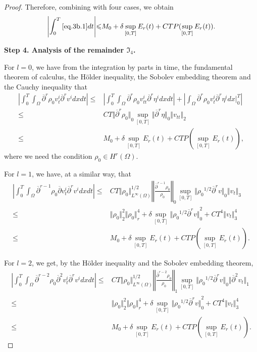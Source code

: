 \documentclass[12pt,twoside,reqno]{amsart}
\numberwithin{equation}{section}
\theoremstyle{definition}
\theoremstyle{remark}
\begin{document}
\begin{proof}
Therefore, combining with four cases, we obtain
\begin{align}
 {\left\vert{\int_0^T\eqref{eq.3b.1}dt}\right\vert} {\leqslant}  M_0+\delta \sup_{[0,T]}E_r(t)+CTP(\sup_{[0,T]}E_r(t)).
\end{align}

\textbf{Step 4. Analysis of the remainder ${\mathfrak{I}}_4$.}

For $l=0$, we have from the integration by parts in time, the fundamental theorem of calculus, the H\"older inequality, the Sobolev embedding theorem and the Cauchy inequality that
\begin{align*}
  {\left\vert{{\int_0^T\!\!\!\!\int_\Omega }  {\overline{\partial}}^r{\rho_0}  v_t^i{\overline{\partial}}^r v^idxdt}\right\vert}{\leqslant}&{\left\vert{{\int_0^T\!\!\!\!\int_\Omega }  {\overline{\partial}}^r{\rho_0}  v_{tt}^i{\overline{\partial}}^r \eta^idxdt}\right\vert}+{\left\vert{\int_\Omega {\overline{\partial}}^r{\rho_0}  v_t^i{\overline{\partial}}^r \eta^idx\Big|_0^T}\right\vert}\\
  {\leqslant}& CT {\Vert{{\overline{\partial}}^r{\rho_0}}\Vert}_0 \sup_{[0,T]}{\Vert{{\overline{\partial}}^r \eta}\Vert}_0{\Vert{v_{tt}}\Vert}_2\\
  {\leqslant}&M_0+\delta\sup_{[0,T]}E_r(t)+CTP(\sup_{[0,T]}E_r(t)),
\end{align*}
where we need the condition ${\rho_0} \in H^{r}(\Omega)$.

For $l=1$, we have, at a similar way, that
\begin{align*}
  {\left\vert{{\int_0^T\!\!\!\!\int_\Omega }  {\overline{\partial}}^{r-1}{\rho_0} {\overline{\partial}}  v_t^i {\overline{\partial}}^r v^idxdt}\right\vert}
  {\leqslant} &CT{\Vert{\rho_0}\Vert}_{L^\infty(\Omega)}^{1/2} {\left\Vert{\frac{{\overline{\partial}}^{r-1}{\rho_0} }{\rho_0}}\right\Vert}_0 \sup_{[0,T]}{\Vert{{\rho_0}^{1/2}{\overline{\partial}}^r v}\Vert}_0{\Vert{v_t}\Vert}_3\\
  {\leqslant} &{\Vert{\rho_0}\Vert}_2^2 {\Vert{\rho_0}\Vert}_r^4+\delta \sup_{[0,T]}{\Vert{{\rho_0}^{1/2}{\overline{\partial}}^r v}\Vert}_0^2 +CT^4{\Vert{v_t}\Vert}_3^4\\
  {\leqslant}&M_0+\delta\sup_{[0,T]}E_r(t)+CTP(\sup_{[0,T]}E_r(t)).
\end{align*}

For $l=2$, we get, by the H\"older inequality and the Sobolev embedding theorem,
\begin{align*}
  {\left\vert{{\int_0^T\!\!\!\!\int_\Omega }  {\overline{\partial}}^{r-2}{\rho_0} {\overline{\partial}}^2  v_t^i {\overline{\partial}}^r v^idxdt}\right\vert}
  {\leqslant} &CT{\Vert{\rho_0}\Vert}_{L^\infty(\Omega)}^{1/2} {\left\Vert{\frac{{\overline{\partial}}^{r-2}{\rho_0} }{\rho_0}}\right\Vert}_1 \sup_{[0,T]}{\Vert{{\rho_0}^{1/2}{\overline{\partial}}^r v}\Vert}_0{\Vert{{\overline{\partial}}^2 v_t}\Vert}_{1}\\
  {\leqslant} &{\Vert{\rho_0}\Vert}_2^2{\Vert{\rho_0}\Vert}_{r}^4+\delta \sup_{[0,T]}{\Vert{{\rho_0}^{1/2}{\overline{\partial}}^r v}\Vert}_0^2 +CT^4{\Vert{v_t}\Vert}_3^4\\
  {\leqslant}&M_0+\delta\sup_{[0,T]}E_r(t)+CTP(\sup_{[0,T]}E_r(t)).
\end{align*}


\end{proof}
\end{document}
